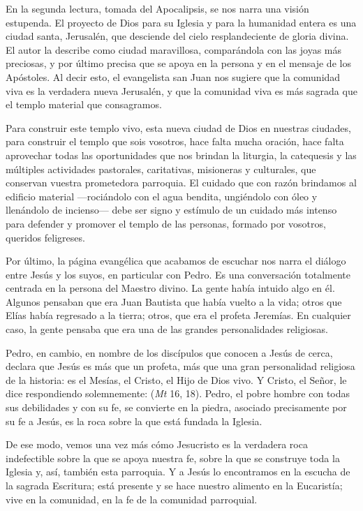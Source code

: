 \begin{body}
\begin{body}
En la segunda lectura, tomada del Apocalipsis, se nos narra una visión estupenda. El proyecto de Dios para su Iglesia y para la humanidad entera es una ciudad santa, Jerusalén, que desciende del cielo resplandeciente de gloria divina. El autor la describe como ciudad maravillosa, comparándola con las joyas más preciosas, y por último precisa que se apoya en la persona y en el mensaje de los Apóstoles. Al decir esto, el evangelista san Juan nos sugiere que la comunidad viva es la verdadera nueva Jerusalén, y que la comunidad viva es más sagrada que el templo material que consagramos.

Para construir este templo vivo, esta nueva ciudad de Dios en nuestras ciudades, para construir el templo que sois vosotros, hace falta mucha oración, hace falta aprovechar todas las oportunidades que nos brindan la liturgia, la catequesis y las múltiples actividades pastorales, caritativas, misioneras y culturales, que conservan  vuestra prometedora parroquia. El cuidado que con razón brindamos al edificio material ---rociándolo con el agua bendita, ungiéndolo con óleo y llenándolo de incienso--- debe ser signo y estímulo de un cuidado más intenso para defender y promover el templo de las personas, formado por vosotros, queridos feligreses.

Por último, la página evangélica que acabamos de escuchar nos narra el diálogo entre Jesús y los suyos, en particular con Pedro. Es una conversación totalmente centrada en la persona del Maestro divino. La gente había intuido algo en él. Algunos pensaban que era Juan Bautista que había vuelto a la vida; otros que Elías había regresado a la tierra; otros, que era el profeta Jeremías. En cualquier caso, la gente pensaba que era una de las grandes personalidades religiosas.

Pedro, en cambio, en nombre de los discípulos que conocen a Jesús de cerca, declara que Jesús es más que un profeta, más que una gran personalidad religiosa de la historia: es el Mesías, el Cristo, el Hijo de Dios vivo. Y Cristo, el Señor, le dice respondiendo solemnemente:  (\emph{Mt} 16, 18). Pedro, el pobre hombre con todas sus debilidades y con su fe, se convierte en la piedra, asociado precisamente por su fe a Jesús, es la roca sobre la que está fundada la Iglesia.

De ese modo, vemos una vez más cómo Jesucristo es la verdadera roca indefectible sobre la que se apoya nuestra fe, sobre la que se construye toda la Iglesia y, así, también esta parroquia. Y a Jesús lo encontramos en la escucha de la sagrada Escritura; está presente y se hace nuestro alimento en la Eucaristía; vive en la comunidad, en la fe de la comunidad parroquial.


\end{body}
\end{body}
